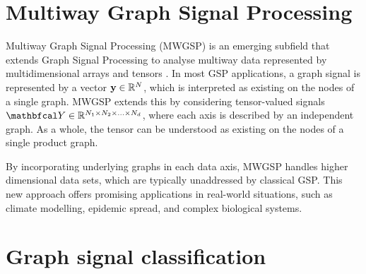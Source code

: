 \cite{Le2022}












 

\section{Multiway Graph Signal Processing}

Multiway Graph Signal Processing (MWGSP) is an emerging subfield that extends Graph Signal Processing to analyse multiway data represented by multidimensional arrays and tensors \citep{Stanley2020}. In most GSP applications, a graph signal is represented by a vector $\mathbf{y} \in \mathbb{R}^N$, which is interpreted as existing on the nodes of a single graph. MWGSP extends this by considering tensor-valued signals $\Yt \in \R^{N_1 \times N_2 \times ... \times N_d}$, where each axis is described by an independent graph. As a whole, the tensor can be understood as existing on the nodes of a single product graph. 

By incorporating underlying graphs in each data axis, MWGSP handles higher dimensional data sets, which are typically unaddressed by classical GSP. This new approach offers promising applications in real-world situations, such as climate modelling, epidemic spread, and complex biological systems.             


\cite{Zhao2023}

\cite{Li2012}



\section{Graph signal classification}

